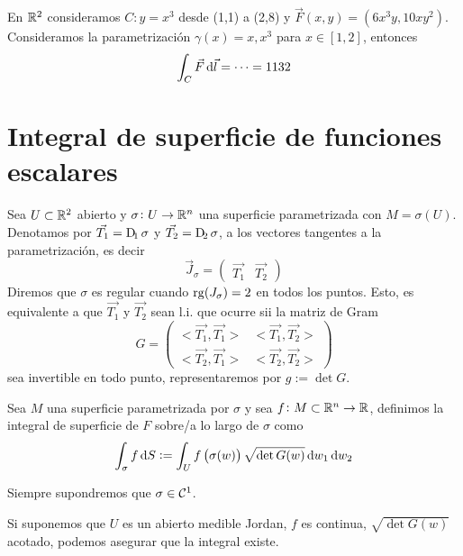\begin{example*}
    En $\mathbb{R}^2$ consideramos $C \colon y = x^3$ desde (1,1) a (2,8) y $\vec{F}(x, y) = \left( 6x^3y, 10xy^2 \right)$. Consideramos
    la parametrización $\gamma(x) = x,x^3$ para $x \in [1,2]$, entonces
    \[
        \int_C \vec{F} \dif \vec{l} = \cdots = 1132
    \]
\end{example*}

\section{Integral de superficie de funciones escalares}

\begin{defi}
    Sea $U \subset  \mathbb{R}^2$ abierto y $\sigma \colon U \to \mathbb{R}^n$ una superficie parametrizada con $M = \sigma(U)$. Denotamos por
    $\vec{T_1} = \Dif_1\sigma$ y $\vec{T_2} = \Dif_2 \sigma$, a los vectores tangentes a la parametrización, es decir
    \[
        \vec{J}_\sigma =
        \begin{pmatrix}
            \vec{T_1} & \vec{T_2}
        \end{pmatrix}
    \]
    Diremos que $\sigma$ es regular cuando $\operatorname{rg}(J_\sigma) = 2$ en todos los puntos. Esto, es equivalente a que $\vec{T_1}$ y $\vec{T_2}$ sean
    l.i. que ocurre sii la matriz de Gram
    \[
        G = 
        \begin{pmatrix}
            <\vec{T_1}, \vec{T_1}> & <\vec{T_1}, \vec{T_2}> \\
            <\vec{T_2}, \vec{T_1}> & <\vec{T_2}, \vec{T_2}>
        \end{pmatrix}
    \]
    sea invertible en todo punto, representaremos por $g := \det G$.
\end{defi}

\begin{defi}
    Sea $M$ una superficie parametrizada por $\sigma$ y sea $f \colon M \subset \mathbb{R}^n \to \mathbb{R}$, definimos la integral de superficie de $F$
    sobre/a lo largo de $\sigma$ como
    \[
        \int_\sigma f \dif S := \int_U f\left( \sigma(w) \right) \sqrt{\det G(w)} \dif w_1 \dif w_2
    \]
\end{defi}

\begin{obs*}
    Siempre supondremos que $\sigma \in \mathcal{C}^1$.
\end{obs*}

\begin{obs*}
    Si suponemos que $U$ es un abierto medible Jordan, $f$ es continua, $\sqrt{\det G(w)}$ acotado, podemos asegurar que la integral existe.
\end{obs*}

